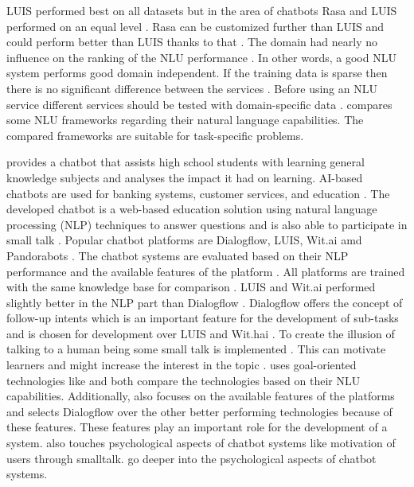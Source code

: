 LUIS performed best on all datasets but in the area of chatbots Rasa and LUIS performed on an equal level \cite{braunEvaluatingNLU}.
Rasa can be customized further than LUIS and could perform better than LUIS thanks to that \cite{braunEvaluatingNLU}. 
The domain had nearly no influence on the ranking of the NLU performance \cite{braunEvaluatingNLU}.
In other words, a good NLU system performs good domain independent.
If the training data is sparse then there is no significant difference between the services \cite{braunEvaluatingNLU}. 
Before using an NLU service different services should be tested with domain-specific data \cite{braunEvaluatingNLU}.
\citet{braunEvaluatingNLU} compares some NLU frameworks regarding their natural language capabilities.
The compared frameworks are suitable for task-specific problems.

\citet{dutta2017developing} provides a chatbot that assists high school students with learning general 
knowledge subjects and analyses the impact it had on learning.
AI-based chatbots are used for banking systems, customer services, and education \cite{dutta2017developing}.
The developed chatbot is a web-based education solution using natural language processing (NLP) techniques
to answer questions and is also able to participate in small talk \cite{dutta2017developing}.
Popular chatbot platforms are Dialogflow, LUIS, Wit.ai amd Pandorabots \cite{dutta2017developing}.
The chatbot systems are evaluated based on their NLP performance and the available features of the platform 
\cite{dutta2017developing}. 
All platforms are trained with the same knowledge base for comparison \cite{dutta2017developing}. 
LUIS and Wit.ai performed slightly better in the NLP part than Dialogflow \cite{dutta2017developing}.
Dialogflow offers the concept of follow-up intents which is an important feature for the development 
of sub-tasks and is chosen for development over LUIS and Wit.hai \cite{dutta2017developing}.
To create the illusion of talking to a human being some small talk is implemented \cite{dutta2017developing}. 
This can motivate learners and might increase the interest in the topic \cite{dutta2017developing}.
\citet{dutta2017developing} uses goal-oriented technologies like \citet{braunEvaluatingNLU} and 
both compare the technologies based on their NLU capabilities.
Additionally, \citet{dutta2017developing} also focuses on the available features of the 
platforms and selects Dialogflow over the other better performing technologies because 
of these features.
These features play an important role for the development of a system.
\citet{dutta2017developing} also touches psychological aspects of chatbot systems 
like motivation of users through smalltalk. 
\citet{GO2019304, brandtzaeg2018chatbots,folstad2017chatbots} go deeper into the psychological aspects of chatbot systems.

